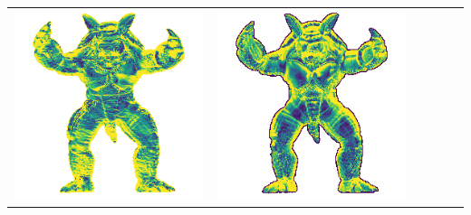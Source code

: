 \begin{center}
\begin{tabularx}{\linewidth}{@{}Y@{}Y@{}Y@{}Y@{}Y@{}Y@{}}
\includegraphics[width=\linewidth]{semisynthetic/20160617_22_yu_err.png} &
\includegraphics[width=\linewidth]{semisynthetic/20160617_22_dpsn_err.png} &

\end{tabularx}
\end{center}
